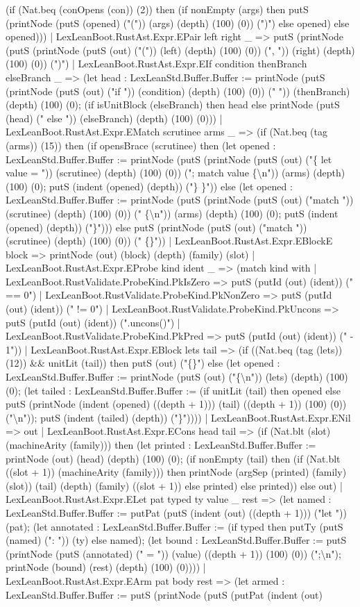 \documentclass[11pt]{article}
\begin{document}
(if (Nat.beq (conOpens (con)) (2)) then (if nonEmpty (args) then putS (printNode (putS (opened) ("(")) (args) (depth) (100) (0)) (")") else opened) else opened))) | LexLeanBoot.RustAst.Expr.EPair left right \_ => putS (printNode (putS (printNode (putS (out) ("(")) (left) (depth) (100) (0)) (", ")) (right) (depth) (100) (0)) (")") | LexLeanBoot.RustAst.Expr.EIf condition thenBranch elseBranch \_ => (let head : LexLeanStd.Buffer.Buffer := printNode (putS (printNode (putS (out) ("if ")) (condition) (depth) (100) (0)) (" ")) (thenBranch) (depth) (100) (0); (if isUnitBlock (elseBranch) then head else printNode (putS (head) (" else ")) (elseBranch) (depth) (100) (0))) | LexLeanBoot.RustAst.Expr.EMatch scrutinee arms \_ => (if (Nat.beq (tag (arms)) (15)) then (if opensBrace (scrutinee) then (let opened : LexLeanStd.Buffer.Buffer := printNode (putS (printNode (putS (out) ("\{ let value = ")) (scrutinee) (depth) (100) (0)) ("; match value \{\textbackslash{}n")) (arms) (depth) (100) (0); putS (indent (opened) (depth)) ("\} \}")) else (let opened : LexLeanStd.Buffer.Buffer := printNode (putS (printNode (putS (out) ("match ")) (scrutinee) (depth) (100) (0)) (" \{\textbackslash{}n")) (arms) (depth) (100) (0); putS (indent (opened) (depth)) ("\}"))) else putS (printNode (putS (out) ("match ")) (scrutinee) (depth) (100) (0)) (" \{\}")) | LexLeanBoot.RustAst.Expr.EBlockE block => printNode (out) (block) (depth) (family) (slot) | LexLeanBoot.RustAst.Expr.EProbe kind ident \_ => (match kind with | LexLeanBoot.RustValidate.ProbeKind.PkIsZero => putS (putId (out) (ident)) (" == 0") | LexLeanBoot.RustValidate.ProbeKind.PkNonZero => putS (putId (out) (ident)) (" != 0") | LexLeanBoot.RustValidate.ProbeKind.PkUncons => putS (putId (out) (ident)) (".uncons()") | LexLeanBoot.RustValidate.ProbeKind.PkPred => putS (putId (out) (ident)) (" - 1")) | LexLeanBoot.RustAst.Expr.EBlock lets tail => (if ((Nat.beq (tag (lets)) (12)) \&\& unitLit (tail)) then putS (out) ("\{\}") else (let opened : LexLeanStd.Buffer.Buffer := printNode (putS (out) ("\{\textbackslash{}n")) (lets) (depth) (100) (0); (let tailed : LexLeanStd.Buffer.Buffer := (if unitLit (tail) then opened else putS (printNode (indent (opened) ((depth + 1))) (tail) ((depth + 1)) (100) (0)) ("\textbackslash{}n")); putS (indent (tailed) (depth)) ("\}")))) | LexLeanBoot.RustAst.Expr.ENil => out | LexLeanBoot.RustAst.Expr.ECons head tail => (if (Nat.blt (slot) (machineArity (family))) then (let printed : LexLeanStd.Buffer.Buffer := printNode (out) (head) (depth) (100) (0); (if nonEmpty (tail) then (if (Nat.blt ((slot + 1)) (machineArity (family))) then printNode (argSep (printed) (family) (slot)) (tail) (depth) (family) ((slot + 1)) else printed) else printed)) else out) | LexLeanBoot.RustAst.Expr.ELet pat typed ty value \_ rest => (let named : LexLeanStd.Buffer.Buffer := putPat (putS (indent (out) ((depth + 1))) ("let ")) (pat); (let annotated : LexLeanStd.Buffer.Buffer := (if typed then putTy (putS (named) (": ")) (ty) else named); (let bound : LexLeanStd.Buffer.Buffer := putS (printNode (putS (annotated) (" = ")) (value) ((depth + 1)) (100) (0)) (";\textbackslash{}n"); printNode (bound) (rest) (depth) (100) (0)))) | LexLeanBoot.RustAst.Expr.EArm pat body rest => (let armed : LexLeanStd.Buffer.Buffer := putS (printNode (putS (putPat (indent (out) 
\end{document}
